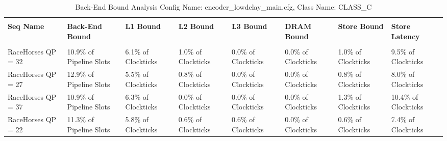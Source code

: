 \documentclass{article}%
\begin{document}
\begin{longtabu}{| X[l] | X[l] | X[l] | X[l] | X[l] | X[l] | X[l] | X[l] |}%
\caption{%
Back{-}End Bound Analysis\newline%
 Config Name: encoder\_lowdelay\_main.cfg,\newline%
 Class Name: CLASS\_C\newline%
%
}%
\hline%
&&&&&&&\\%
\textbf{Seq Name}&\textbf{Back{-}End Bound}&\textbf{L1 Bound}&\textbf{L2 Bound}&\textbf{L3 Bound}&\textbf{DRAM Bound}&\textbf{Store Bound}&\textbf{Store Latency}\\%
&&&&&&&\\%
\hline%
\endhead%
RaceHorses\newline%
 QP = 32&10.9\% of Pipeline Slots&6.1\% of Clockticks&1.0\% of Clockticks&0.0\% of Clockticks&0.0\% of Clockticks&1.0\% of Clockticks&9.5\% of Clockticks\\%
\hline%
RaceHorses\newline%
 QP = 27&12.9\% of Pipeline Slots&5.5\% of Clockticks&0.8\% of Clockticks&0.0\% of Clockticks&0.0\% of Clockticks&0.8\% of Clockticks&8.0\% of Clockticks\\%
\hline%
RaceHorses\newline%
 QP = 37&10.9\% of Pipeline Slots&6.3\% of Clockticks&0.0\% of Clockticks&0.0\% of Clockticks&0.0\% of Clockticks&1.3\% of Clockticks&10.4\% of Clockticks\\%
\hline%
RaceHorses\newline%
 QP = 22&11.3\% of Pipeline Slots&5.8\% of Clockticks&0.6\% of Clockticks&0.6\% of Clockticks&0.0\% of Clockticks&0.6\% of Clockticks&7.4\% of Clockticks\\%
\hline%
\end{longtabu}%
\newpage

%
\end{document}
